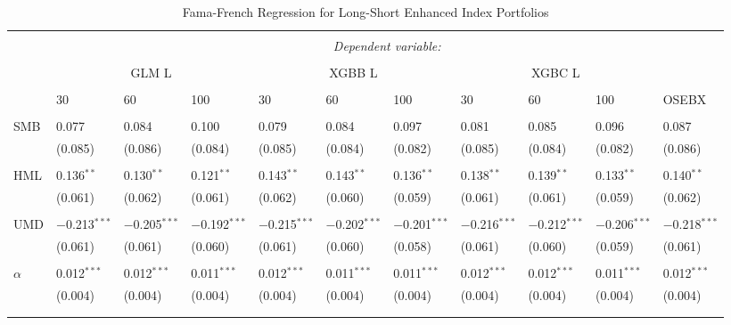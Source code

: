 \begin{table}[H] \centering 
  \caption{Fama-French Regression for Long-Short Enhanced Index Portfolios} 
  \label{table:FAMA-FRENCH-LONG-ONLY-ENHANCED-FINAL} 
\begin{tabularx}{\textwidth}{XXXXXXXXXXl} 
\\[-1.8ex]\hline 
\hline \\[-1.8ex] 
 & \multicolumn{10}{c}{\textit{Dependent variable:}} \\ 
\cline{2-11} 
\\[-1.8ex] 
& \multicolumn{3}{c}{GLM L} & \multicolumn{3}{c}{XGBB L} & \multicolumn{3}{c}{XGBC L} & \\
\cline{2-11}
\\[-1.8ex] 
& 30 & 60 & 100 & 30 & 60 & 100 & 30 & 60 & 100 & OSEBX \\ 
\cline{2-11} \\
 SMB & 0.077 & 0.084 & 0.100 & 0.079 & 0.084 & 0.097 & 0.081 & 0.085 & 0.096 & 0.087 \\ 
  & (0.085) & (0.086) & (0.084) & (0.085) & (0.084) & (0.082) & (0.085) & (0.084) & (0.082) & (0.086) \\ 
  & & & & & & & & & & \\ 
 HML & 0.136$^{**}$ & 0.130$^{**}$ & 0.121$^{**}$ & 0.143$^{**}$ & 0.143$^{**}$ & 0.136$^{**}$ & 0.138$^{**}$ & 0.139$^{**}$ & 0.133$^{**}$ & 0.140$^{**}$ \\ 
  & (0.061) & (0.062) & (0.061) & (0.062) & (0.060) & (0.059) & (0.061) & (0.061) & (0.059) & (0.062) \\ 
  & & & & & & & & & & \\ 
 UMD & $-$0.213$^{***}$ & $-$0.205$^{***}$ & $-$0.192$^{***}$ & $-$0.215$^{***}$ & $-$0.202$^{***}$ & $-$0.201$^{***}$ & $-$0.216$^{***}$ & $-$0.212$^{***}$ & $-$0.206$^{***}$ & $-$0.218$^{***}$ \\ 
  & (0.061) & (0.061) & (0.060) & (0.061) & (0.060) & (0.058) & (0.061) & (0.060) & (0.059) & (0.061) \\ 
  & & & & & & & & & & \\ 
 $\alpha$ & 0.012$^{***}$ & 0.012$^{***}$ & 0.011$^{***}$ & 0.012$^{***}$ & 0.011$^{***}$ & 0.011$^{***}$ & 0.012$^{***}$ & 0.012$^{***}$ & 0.011$^{***}$ & 0.012$^{***}$ \\ 
  & (0.004) & (0.004) & (0.004) & (0.004) & (0.004) & (0.004) & (0.004) & (0.004) & (0.004) & (0.004) \\ 
  & & & & & & & & & & \\ 
\hline \\[-1.8ex] 

\end{tabularx}
\end{table}
